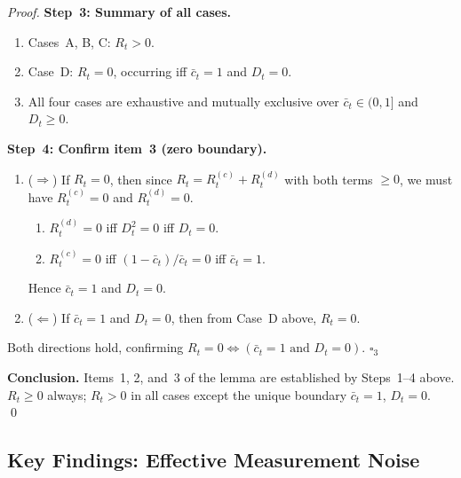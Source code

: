 \documentclass[12pt,openany]{book}
\numberwithin{equation}{chapter}
\theoremstyle{plain}
\theoremstyle{definition}
\theoremstyle{remark}
\begin{document}
\begin{proof}
\medskip
\noindent\textbf{Step~3: Summary of all cases.}

\begin{enumerate}
  \item Cases~A, B, C: $R_t > 0$.
  \item Case~D: $R_t = 0$, occurring iff
        $\bar{c}_t = 1$ and $D_t = 0$.
  \item All four cases are exhaustive and mutually exclusive
        over $\bar{c}_t \in (0,1]$ and $D_t \geq 0$.
\end{enumerate}

\medskip
\noindent\textbf{Step~4: Confirm item~3 (zero boundary).}
\begin{enumerate}
  \item ($\Rightarrow$) If $R_t = 0$, then since
        $R_t = R_t^{(c)} + R_t^{(d)}$ with both terms
        $\geq 0$, we must have $R_t^{(c)} = 0$ and
        $R_t^{(d)} = 0$.
        \begin{enumerate}
          \item $R_t^{(d)} = 0$ iff $D_t^2 = 0$ iff
                $D_t = 0$.
          \item $R_t^{(c)} = 0$ iff
                $(1-\bar{c}_t)/\bar{c}_t = 0$ iff
                $\bar{c}_t = 1$.
        \end{enumerate}
        Hence $\bar{c}_t = 1$ and $D_t = 0$.
  \item ($\Leftarrow$) If $\bar{c}_t = 1$ and $D_t = 0$,
        then from Case~D above, $R_t = 0$.
\end{enumerate}
Both directions hold, confirming
$R_t = 0 \iff (\bar{c}_t = 1 \text{ and } D_t = 0)$.
\qquad $\square_3$

\medskip
\noindent\textbf{Conclusion.}
Items~1, 2, and~3 of the lemma are established by
Steps~1--4 above.  $R_t \geq 0$ always;
$R_t > 0$ in all cases except the unique
boundary $\bar{c}_t = 1$, $D_t = 0$.
\qed
\end{proof}

\subsection{Key Findings: Effective Measurement Noise}
\end{document}

